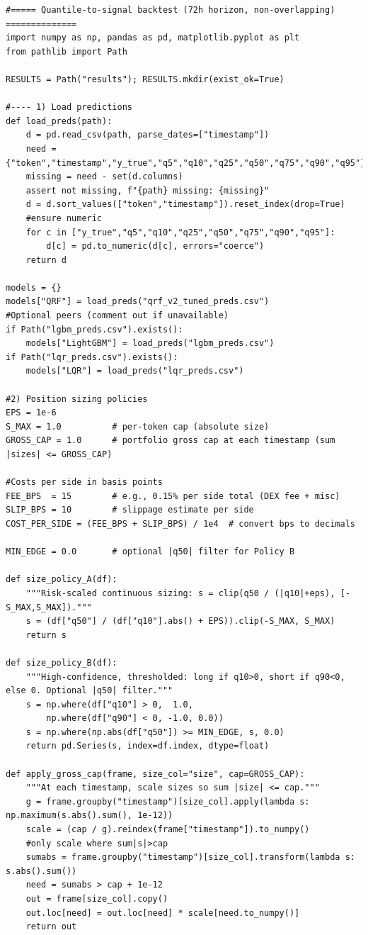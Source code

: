 \documentclass[
  a4paper,
  DIV=11,
  numbers=noendperiod]{scrreprt}
\begin{document}
\begin{verbatim}
#===== Quantile-to-signal backtest (72h horizon, non-overlapping) ==============
import numpy as np, pandas as pd, matplotlib.pyplot as plt
from pathlib import Path

RESULTS = Path("results"); RESULTS.mkdir(exist_ok=True)

#---- 1) Load predictions 
def load_preds(path):
    d = pd.read_csv(path, parse_dates=["timestamp"])
    need = {"token","timestamp","y_true","q5","q10","q25","q50","q75","q90","q95"}
    missing = need - set(d.columns)
    assert not missing, f"{path} missing: {missing}"
    d = d.sort_values(["token","timestamp"]).reset_index(drop=True)
    #ensure numeric
    for c in ["y_true","q5","q10","q25","q50","q75","q90","q95"]:
        d[c] = pd.to_numeric(d[c], errors="coerce")
    return d

models = {}
models["QRF"] = load_preds("qrf_v2_tuned_preds.csv")
#Optional peers (comment out if unavailable)
if Path("lgbm_preds.csv").exists():
    models["LightGBM"] = load_preds("lgbm_preds.csv")
if Path("lqr_preds.csv").exists():
    models["LQR"] = load_preds("lqr_preds.csv")

#2) Position sizing policies
EPS = 1e-6
S_MAX = 1.0          # per-token cap (absolute size)
GROSS_CAP = 1.0      # portfolio gross cap at each timestamp (sum |sizes| <= GROSS_CAP)

#Costs per side in basis points
FEE_BPS  = 15        # e.g., 0.15% per side total (DEX fee + misc)
SLIP_BPS = 10        # slippage estimate per side
COST_PER_SIDE = (FEE_BPS + SLIP_BPS) / 1e4  # convert bps to decimals

MIN_EDGE = 0.0       # optional |q50| filter for Policy B

def size_policy_A(df):
    """Risk-scaled continuous sizing: s = clip(q50 / (|q10|+eps), [-S_MAX,S_MAX])."""
    s = (df["q50"] / (df["q10"].abs() + EPS)).clip(-S_MAX, S_MAX)
    return s

def size_policy_B(df):
    """High-confidence, thresholded: long if q10>0, short if q90<0, else 0. Optional |q50| filter."""
    s = np.where(df["q10"] > 0,  1.0,
        np.where(df["q90"] < 0, -1.0, 0.0))
    s = np.where(np.abs(df["q50"]) >= MIN_EDGE, s, 0.0)
    return pd.Series(s, index=df.index, dtype=float)

def apply_gross_cap(frame, size_col="size", cap=GROSS_CAP):
    """At each timestamp, scale sizes so sum |size| <= cap."""
    g = frame.groupby("timestamp")[size_col].apply(lambda s: np.maximum(s.abs().sum(), 1e-12))
    scale = (cap / g).reindex(frame["timestamp"]).to_numpy()
    #only scale where sum|s|>cap
    sumabs = frame.groupby("timestamp")[size_col].transform(lambda s: s.abs().sum())
    need = sumabs > cap + 1e-12
    out = frame[size_col].copy()
    out.loc[need] = out.loc[need] * scale[need.to_numpy()]
    return out


\end{verbatim}
\end{document}
